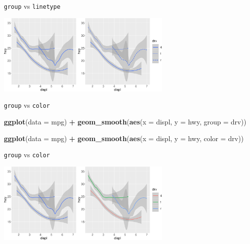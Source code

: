 \documentclass[ignorenonframetext,]{beamer}
\newenvironment{Shaded}{\begin{snugshade}}{\end{snugshade}}
\newcommand{\DataTypeTok}[1]{\textcolor[rgb]{0.13,0.29,0.53}{#1}}
\newcommand{\KeywordTok}[1]{\textcolor[rgb]{0.13,0.29,0.53}{\textbf{#1}}}
\newcommand{\NormalTok}[1]{#1}
\newcommand{\OperatorTok}[1]{\textcolor[rgb]{0.81,0.36,0.00}{\textbf{#1}}}
\newcommand{\StringTok}[1]{\textcolor[rgb]{0.31,0.60,0.02}{#1}}
\begin{document}
\begin{frame}{\texttt{group} vs \texttt{linetype}}
\protect\hypertarget{group-vs-linetype-1}{}

\begin{center}\includegraphics[height=150px]{data-visualization_files/figure-beamer/unnamed-chunk-33-1} \end{center}

\end{frame}

\begin{frame}[fragile]{\texttt{group} vs \texttt{color}}
\protect\hypertarget{group-vs-color}{}

\begin{Shaded}
\begin{Highlighting}[]
\KeywordTok{ggplot}\NormalTok{(}\DataTypeTok{data =}\NormalTok{ mpg) }\OperatorTok{+}
\StringTok{  }\KeywordTok{geom_smooth}\NormalTok{(}\KeywordTok{aes}\NormalTok{(}\DataTypeTok{x =}\NormalTok{ displ, }\DataTypeTok{y =}\NormalTok{ hwy, }\DataTypeTok{group =}\NormalTok{ drv))}

\KeywordTok{ggplot}\NormalTok{(}\DataTypeTok{data =}\NormalTok{ mpg) }\OperatorTok{+}
\StringTok{  }\KeywordTok{geom_smooth}\NormalTok{(}\KeywordTok{aes}\NormalTok{(}\DataTypeTok{x =}\NormalTok{ displ, }\DataTypeTok{y =}\NormalTok{ hwy, }\DataTypeTok{color =}\NormalTok{ drv))}
\end{Highlighting}
\end{Shaded}

\end{frame}

\begin{frame}{\texttt{group} vs \texttt{color}}
\protect\hypertarget{group-vs-color-1}{}

\begin{center}\includegraphics[height=150px]{data-visualization_files/figure-beamer/unnamed-chunk-35-1} \end{center}

\end{frame}
\end{document}
